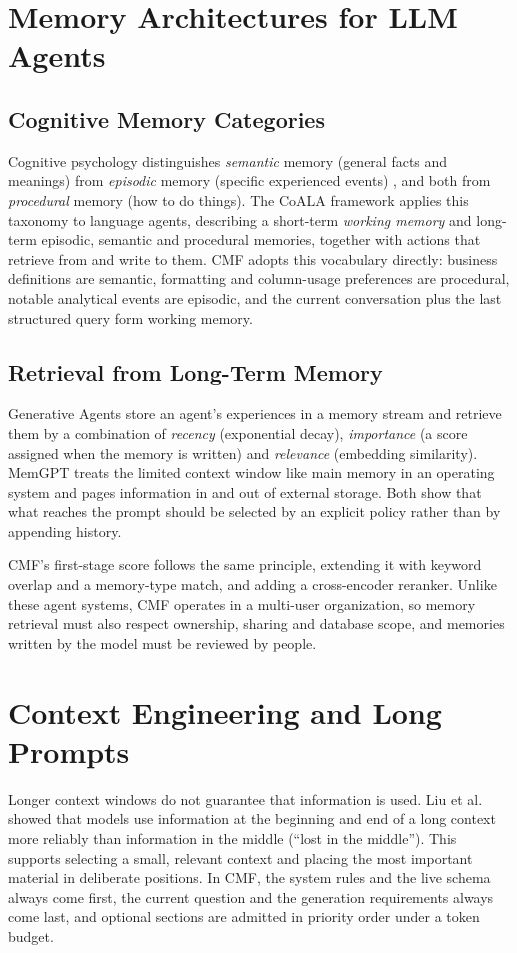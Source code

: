 \section{Memory Architectures for LLM Agents}

\subsection{Cognitive Memory Categories}
Cognitive psychology distinguishes \textit{semantic} memory (general facts and meanings)
from \textit{episodic} memory (specific experienced events) \cite{tulving1972episodic}, and
both from \textit{procedural} memory (how to do things). The CoALA framework
\cite{sumers2023coala} applies this taxonomy to language agents, describing a short-term
\textit{working memory} and long-term episodic, semantic and procedural memories, together
with actions that retrieve from and write to them. CMF adopts this vocabulary directly:
business definitions are semantic, formatting and column-usage preferences are procedural,
notable analytical events are episodic, and the current conversation plus the last
structured query form working memory.

\subsection{Retrieval from Long-Term Memory}
Generative Agents \cite{park2023generative} store an agent's experiences in a memory stream
and retrieve them by a combination of \textit{recency} (exponential decay), \textit{importance}
(a score assigned when the memory is written) and \textit{relevance} (embedding similarity).
MemGPT \cite{packer2023memgpt} treats the limited context window like main memory in an
operating system and pages information in and out of external storage. Both show that what
reaches the prompt should be selected by an explicit policy rather than by appending
history.

CMF's first-stage score follows the same principle, extending it with keyword overlap and
a memory-type match, and adding a cross-encoder reranker. Unlike these agent systems, CMF
operates in a multi-user organization, so memory retrieval must also respect ownership,
sharing and database scope, and memories written by the model must be reviewed by people.

\section{Context Engineering and Long Prompts}
Longer context windows do not guarantee that information is used. Liu et al.\
\cite{liu2023lost} showed that models use information at the beginning and end of a long
context more reliably than information in the middle (``lost in the middle''). This
supports selecting a small, relevant context and placing the most important material in
deliberate positions. In CMF, the system rules and the live schema always come first, the
current question and the generation requirements always come last, and optional sections
are admitted in priority order under a token budget.

